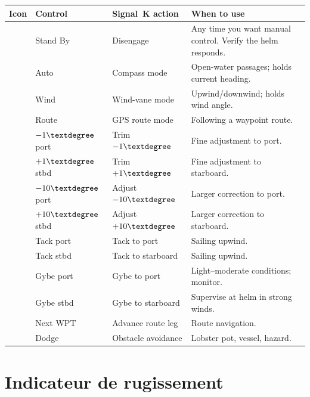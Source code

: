 \begin{longtable}{C{1.4cm}L{2.4cm}L{4.6cm}L{5.3cm}}
\toprule
{}
\color{white}\sffamily\bfseries Icon &
\color{white}\sffamily\bfseries Control &
\color{white}\sffamily\bfseries Signal~K action &
\color{white}\sffamily\bfseries When to use \\
\midrule
{}                & Stand By    & Disengage         & Any time you want manual control. Verify the helm responds. \\
           & Auto        & Compass mode      & Open-water passages; holds current heading. \\
                      & Wind        & Wind-vane mode    & Upwind/downwind; holds wind angle. \\
            & Route       & GPS route mode    & Following a waypoint route. \\
               & $-1\textdegree$ port  & Trim $-1\textdegree$ & Fine adjustment to port. \\
                & $+1\textdegree$ stbd  & Trim $+1\textdegree$ & Fine adjustment to starboard. \\
  & $-10\textdegree$ port & Adjust $-10\textdegree$ & Larger correction to port. \\
 & $+10\textdegree$ stbd & Adjust $+10\textdegree$ & Larger correction to starboard. \\
           & Tack port   & Tack to port      & Sailing upwind. \\
          & Tack stbd   & Tack to starboard & Sailing upwind. \\
  & Gybe port   & Gybe to port      & Light--moderate conditions; monitor. \\
 & Gybe stbd   & Gybe to starboard & Supervise at helm in strong winds. \\
       & Next WPT    & Advance route leg & Route navigation. \\
                      & Dodge       & Obstacle avoidance & Lobster pot, vessel, hazard. \\
\bottomrule
\end{longtable}

\section{Indicateur de rugissement}

